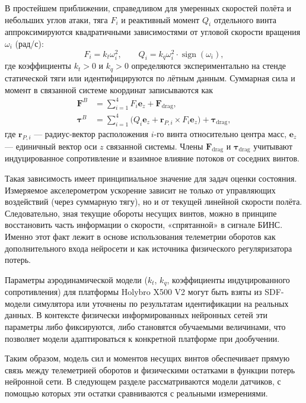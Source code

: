 В простейшем приближении, справедливом для умеренных скоростей полёта и небольших углов атаки, тяга \(F_i\) и реактивный момент \(Q_i\) отдельного винта аппроксимируются квадратичными зависимостями от угловой скорости вращения \(\omega_i\) (рад/с):
\begin{equation}
	F_i = k_t \omega_i^2, \qquad
	Q_i = k_q \omega_i^2 \cdot \operatorname{sign}(\omega_i),
	\label{eq:thrust_simple}
\end{equation}
где коэффициенты \(k_t > 0\) и \(k_q > 0\) определяются экспериментально на стенде статической тяги или идентифицируются по лётным данным. Суммарная сила и момент в связанной системе координат записываются как
\begin{align}
	\mathbf{F}^B &= \sum_{i=1}^4 F_i \mathbf{e}_z + \mathbf{F}_\text{drag}, \\
	\boldsymbol{\tau}^B &= \sum_{i=1}^4 \bigl( Q_i \mathbf{e}_z + \mathbf{r}_{P,i} \times F_i \mathbf{e}_z \bigr) + \boldsymbol{\tau}_\text{drag},
	\label{eq:total_force_moment}
\end{align}
где \(\mathbf{r}_{P,i}\) — радиус-вектор расположения \(i\)-го винта относительно центра масс, \(\mathbf{e}_z\) — единичный вектор оси \(z\) связанной системы. Члены \(\mathbf{F}_\text{drag}\) и \(\boldsymbol{\tau}_\text{drag}\) учитывают индуцированное сопротивление и взаимное влияние потоков от соседних винтов.


Такая зависимость имеет принципиальное значение для задач оценки состояния. Измеряемое акселерометром ускорение зависит не только от управляющих воздействий (через суммарную тягу), но и от текущей линейной скорости полёта. Следовательно, зная текущие обороты несущих винтов, можно в принципе восстановить часть информации о скорости, «спрятанной» в сигнале БИНС. Именно этот факт лежит в основе использования телеметрии оборотов как дополнительного входа нейросети и как источника физического регуляризатора потерь.

Параметры аэродинамической модели (\(k_t\), \(k_q\), коэффициенты индуцированного сопротивления) для платформы Holybro X500 V2 могут быть взяты из SDF-модели симулятора или уточнены по результатам идентификации на реальных данных. В контексте физически информированных нейронных сетей эти параметры либо фиксируются, либо становятся обучаемыми величинами, что позволяет модели адаптироваться к конкретной платформе при дообучении.

Таким образом, модель сил и моментов несущих винтов обеспечивает прямую связь между телеметрией оборотов и физическими остатками в функции потерь нейронной сети. В следующем разделе рассматриваются модели датчиков, с помощью которых эти остатки сравниваются с реальными измерениями.


